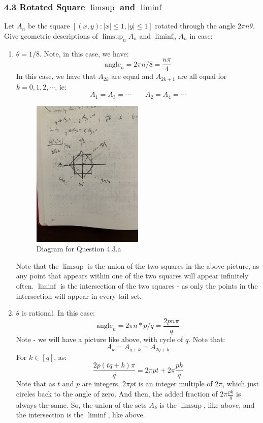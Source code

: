 \documentclass[12pt,a4paper]{article}
\newcommand{\1}[1]{\mathbbm{1}\left\{ #1 \right\}}
\begin{document}
\subsubsection{4.3 Rotated Square $\limsup$ and $\liminf$} Let $A_n$ be the square $[(x,y) : |x| \leq 1, |y| \leq 1]$ rotated through the angle $2\pi n\theta$. Give geometric descriptions of $\limsup_n A_n$ and $\liminf_n A_n$ in case:
\begin{enumerate}
	\item $\theta = 1/8$. Note, in this case, we have:
	$$
		\text{angle}_n = 2\pi n / 8 = \frac{n\pi}{4}
	$$
	In this case, we have that $A_{2k}$ are equal and $A_{2k + 1}$ are all equal for $k = 0, 1, 2, \cdots$, ie:
	$$
		A_1 = A_3 = \cdots
		\quad\quad
		A_2 = A_4 = \cdots
	$$
	\begin{figure}[H]
		\centering
		\includegraphics[angle=270, width=0.5\textwidth]{problem-4.3.a.jpg}
		\caption{Diagram for Question 4.3.a}
		\label{fig:example1}
	\end{figure} 
	\noindent Note that the $\limsup$ is the union of the two squares in the above picture, as any point that appears within one of the two squares will appear infinitely often. $\liminf$ is the intersection of the two squares - as only the points in the intersection will appear in every tail set.
	
	\item $\theta$ is rational. In this case:
	$$
		\text{angle}_n = 2\pi n * p/q = \frac{2p n\pi}{q}
	$$
	Note - we will have a picture like above, with cycle of $q$. Note that:
	$$
		A_{k} = A_{q + k} = A_{2q + k}
	$$
	For $k \in [q]$, as:
	$$
		\frac{2p (tq + k)\pi}{q} =
		2\pi pt + 2\pi \frac{pk}{q}
	$$
	Note that as $t$ and $p$ are integers, $2\pi pt$ is an integer multiple of $2\pi$, which just circles back to the angle of zero. And then, the added fraction of $ 2\pi \frac{pk}{q}$ is always the same. So, the union of the sets $A_k$ is the $\limsup$, like above, and the intersection is the $\liminf$, like above.
	

\end{enumerate}
\end{document}
